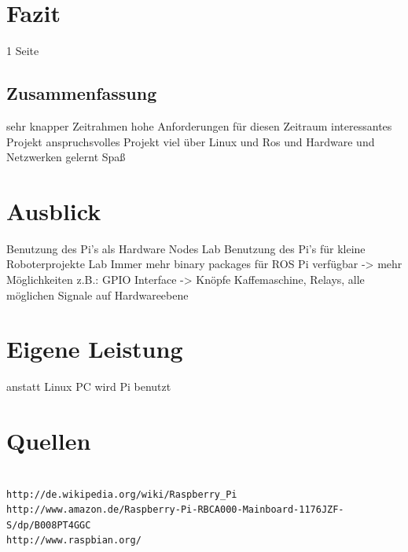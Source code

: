 \documentclass[12pt]{article}
\begin{document}
\section{Fazit}
1 Seite
\subsection{Zusammenfassung}

sehr knapper Zeitrahmen
hohe Anforderungen für diesen Zeitraum
interessantes Projekt
anspruchsvolles Projekt
viel über Linux und Ros und Hardware und Netzwerken gelernt
Spaß

\section{Ausblick}

Benutzung des Pi's als Hardware Nodes Lab
Benutzung des Pi's für kleine Roboterprojekte Lab
Immer mehr binary packages für ROS Pi verfügbar -> mehr Möglichkeiten
z.B.: GPIO Interface -> Knöpfe Kaffemaschine, Relays, alle möglichen Signale
auf Hardwareebene

\section{Eigene Leistung}

anstatt Linux PC wird Pi benutzt

\section{Quellen}
\begin{verbatim}

http://de.wikipedia.org/wiki/Raspberry_Pi
http://www.amazon.de/Raspberry-Pi-RBCA000-Mainboard-1176JZF-S/dp/B008PT4GGC
http://www.raspbian.org/
\end{verbatim}
\end{document}
